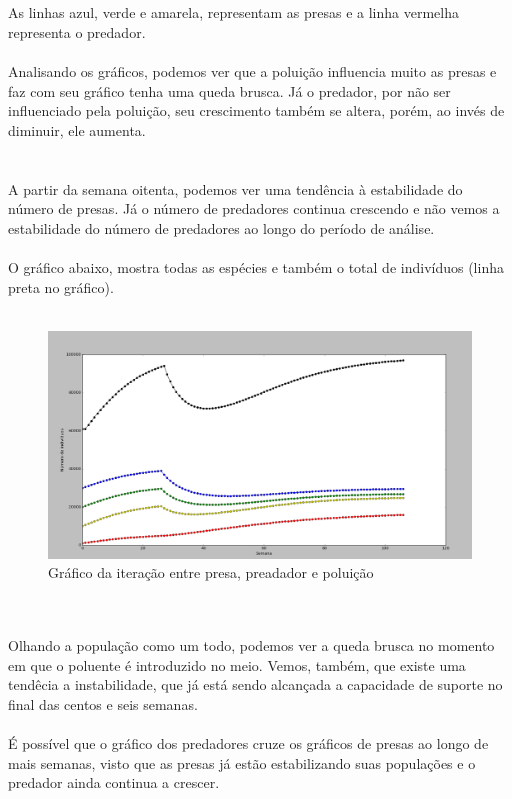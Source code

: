 \documentclass[a4paper]{article}
\begin{document}
\\
\\
As linhas azul, verde e amarela, representam as presas e a linha vermelha representa o predador.
\\
\\
Analisando os gr\'aficos, podemos ver que a polui\c{c}\~ao influencia muito as presas e faz com seu gr\'afico tenha uma queda brusca. J\'a o predador, por n\~ao ser influenciado pela polui\c{c}\~ao, seu crescimento tamb\'em se altera, por\'em, ao inv\'es de diminuir, ele aumenta.\\
\\
\\
A partir da semana oitenta, podemos ver uma tend\^encia \`a estabilidade do n\'umero de presas. J\'a o n\'umero de predadores continua crescendo e n\~ao vemos a estabilidade do n\'umero de predadores ao longo do per\'iodo de an\'alise.
\\
\\
O gr\'afico abaixo, mostra todas as esp\'ecies e tamb\'em o total de indiv\'iduos (linha preta no gr\'afico).
\\
\\
\begin{figure}[!htb]
\centering
\caption{Gr\'afico da itera\c{c}\~ao entre presa, preadador e polui\c{c}\~ao}
\includegraphics[scale=0.25]{graf_total_ind.png}
\end{figure}
\\
\\
Olhando a popula\c{c}\~ao como um todo, podemos ver a queda brusca no momento em que o poluente \'e introduzido no meio. Vemos, tamb\'em, que existe uma tend\^ecia a instabilidade, que j\'a est\'a sendo alcan\c{c}ada a capacidade de suporte no final das centos e seis semanas.
\\
\\
\'E poss\'ivel que o gr\'afico dos predadores cruze os gr\'aficos de presas ao longo de mais semanas, visto que as presas j\'a est\~ao estabilizando suas popula\c{c}\~oes e o predador ainda continua a crescer.
\\
\\
\end{document}
